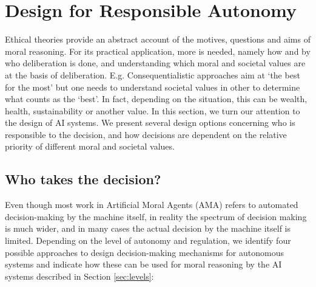 \documentclass[twocolumn]{article}
\begin{document}
\section{Design for Responsible Autonomy}\label{sec:design}
Ethical theories provide an abstract account of the motives, questions and aims of moral reasoning. For its practical application, more is needed, namely how and by who deliberation is done, and understanding which moral and societal values are at the basis of deliberation. E.g. Consequentialistic approaches aim at `the best for the most' but one needs to understand societal values in other to determine what counts as the `best'. In fact, depending on the situation, this can be wealth, health, sustainability or another value. In this section, we turn our attention to the design of AI systems.
We present several design options concerning who is responsible to the decision, and how decisions are dependent on the relative priority of different moral and societal values.




\subsection{Who takes the decision?}\label{sec:who}
Even though most work in Artificial Moral Agents (AMA) refers to automated decision-making by the machine itself, in reality the spectrum of decision making is much wider, and in many cases the actual decision by the machine itself is limited. Depending on the level of autonomy and regulation, we identify four possible approaches to design decision-making mechanisms for autonomous systems and indicate how these can be used for moral reasoning by the AI systems described in Section \ref{sec:levels}: %
\end{document}
